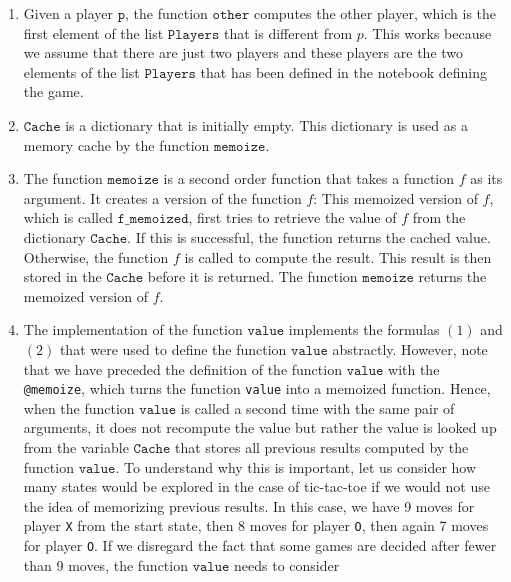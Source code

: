 \begin{enumerate}
\item Given a player $\texttt{p}$, the function $\texttt{other}$ computes the other player,
      which is the first element of the list $\texttt{Players}$ that is different from $p$.
      This works because we assume that there are just two players and these players are the two elements of
      the list $\texttt{Players}$ that has been defined in the notebook defining the game.
\item $\texttt{Cache}$ is a dictionary that is initially empty.  This dictionary is used as a memory cache by 
      the function $\texttt{memoize}$.
\item The function $\mathtt{memoize}$ is a second order function that takes a function $f$ as its argument.
      It creates a  version of the function $f$:  This memoized version of $f$, which is called
      $\mathtt{f\_memoized}$, first tries to retrieve the value of $f$ from the dictionary $\texttt{Cache}$.
      If this is successful, the function returns the cached value.  Otherwise, the function $f$ is called
      to compute the result.  This result is then stored in the $\mathtt{Cache}$ before it is returned.
      The function $\mathtt{memoize}$ returns the memoized version of $f$.
\item The implementation of the function $\texttt{value}$ implements the formulas $(1)$ and $(2)$ that were
      used to define the function $\mathtt{value}$ abstractly.
      However, note that we have preceded the definition of the function $\texttt{value}$ with the
       \texttt{@memoize}, which turns the function \texttt{value} into a memoized function.
      Hence, when the function $\texttt{value}$ is called a
      second time with the same pair of arguments, it does not recompute the value but rather the value is
      looked up from the variable $\texttt{Cache}$ that stores all previous results computed by the function $\texttt{value}$.  To
      understand why this is important, 
      let us consider how many states would be explored in the case of tic-tac-toe if we would not use the idea
      of memorizing previous results.  In this case, we have 9 moves for player
      \texttt{X} from the start state, then 8 moves for player \texttt{O}, then again 7 moves for
      player \texttt{O}.  If we disregard the fact that some games are decided after fewer than 9 moves,
      the function $\texttt{value}$ needs to consider 
      \\[0.2cm]

\end{enumerate}
